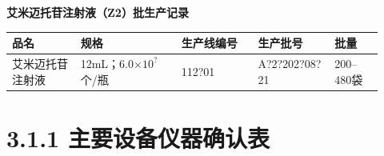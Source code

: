 \documentclass[UTF8,10pt,a4paper,fontset=fandol]{ctexart}
\newcommand{\fieldvalue}[1]{#1}
\newcommand{\handwritten}[1]{#1}
\begin{document}
\begin{center}
\textbf{艾米迈托苷注射液（Z2）批生产记录}
\end{center}

\begin{tabular}{|p{0.17\linewidth}|p{0.25\linewidth}|p{0.19\linewidth}|p{0.19\linewidth}|p{0.12\linewidth}|}
\hline
品名 & 规格 & 生产线编号 & 生产批号 & 批量 \\
\hline
\fieldvalue{艾米迈托苷注射液}
&
\fieldvalue{12mL；6.0$\times 10^{?}$个/瓶}
&
\fieldvalue{\handwritten{112?01}}
&
\fieldvalue{\handwritten{A?2?202?08?21}}
&
\fieldvalue{200--480袋}
\\
\hline
\end{tabular}

\section*{3.1.1 主要设备仪器确认表}
\end{document}
